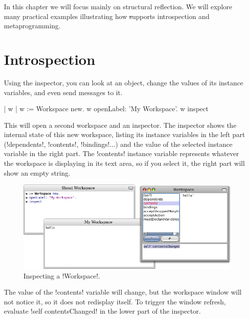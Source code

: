 \documentclass[a4paper,10pt,twoside]{book}
\begin{document}
In this chapter we will focus mainly on structural reflection.
We will explore many practical examples illustrating how \st supports introspection and metaprogramming.

\section{Introspection}

Using the inspector, you can look at an object, change the values of its instance variables, and even send messages to it.

\begin{code}{| w |}
w := Workspace new.
w openLabel: 'My Workspace'.
w inspect
\end{code}

This will open a second workspace and an inspector.
The inspector shows the internal state of this new workspace, listing its instance variables in the left part (\ct!dependents!, \ct!contents!, \ct!bindings!...) and the value of the selected instance variable in the right part.
The \ct!contents! instance variable represents whatever the workspace is displaying in its text area, so if you select it, the right part will show an empty string.

\begin{figure}[ht]\centering
	\includegraphics[width=\linewidth]{workspaceInspector}
	\caption{Inspecting a \ct!Workspace!.\label{fig:workspaceInspector}}
\end{figure}

The value of the \ct!contents! variable will change, but the workspace window will not notice it, so it does not redisplay itself.
To trigger the window refresh, evaluate \ct!self contentsChanged! in the lower part of the inspector.

\end{document}
